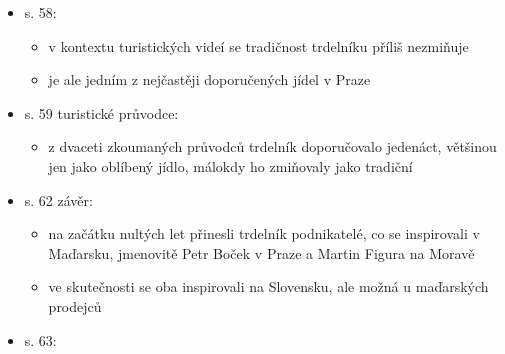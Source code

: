 \begin{itemize}
\begin{itemize}
\begin{itemize}
      \begin{itemize}
      \tightlist
      \item
        jedním z hlavních zdrojů přívlastku tradiční u trdelníku jsou
        prodejci. nepoužívají ho ale všichni a dokonce ani většina, to
        se děje hlavně v Praze
      \item
        ale i další používají historizující vizuální prvky
      \item
        i novináři v začátcích prodeje (nulté roky) psali o trdleníku
        jako tradičním, staročeským nebo i staropražským
      \item
        na sociálních sítích probíhá antikampaň, která se pokouší o
        diskreditaci podnikání s trdelníkem v Česku
      \item
        pozitivní propagaci obvykle provádějí jen zahraniční turisti na
        youtbe, tiktoku, nebo instagramu
      \end{itemize}
    \item
      s. 58:

      \begin{itemize}
      \tightlist
      \item
        v kontextu turistických videí se tradičnost trdelníku příliš
        nezmiňuje
      \item
        je ale jedním z nejčastěji doporučených jídel v Praze
      \end{itemize}
    \item
      s. 59 turistické průvodce:

      \begin{itemize}
      \tightlist
      \item
        z dvaceti zkoumaných průvodců trdelník doporučovalo jedenáct,
        většinou jen jako oblíbený jídlo, málokdy ho zmiňovaly jako
        tradiční
      \end{itemize}
    \item
      s. 62 závěr:

      \begin{itemize}
      \tightlist
      \item
        na začátku nultých let přinesli trdelník podnikatelé, co se
        inspirovali v Maďarsku, jmenovitě Petr Boček v Praze a Martin
        Figura na Moravě
      \item
        ve skutečnosti se oba inspirovali na Slovensku, ale možná u
        maďarských prodejců
      \end{itemize}
    \item
      s. 63:


\end{itemize}
\end{itemize}
\end{itemize}
